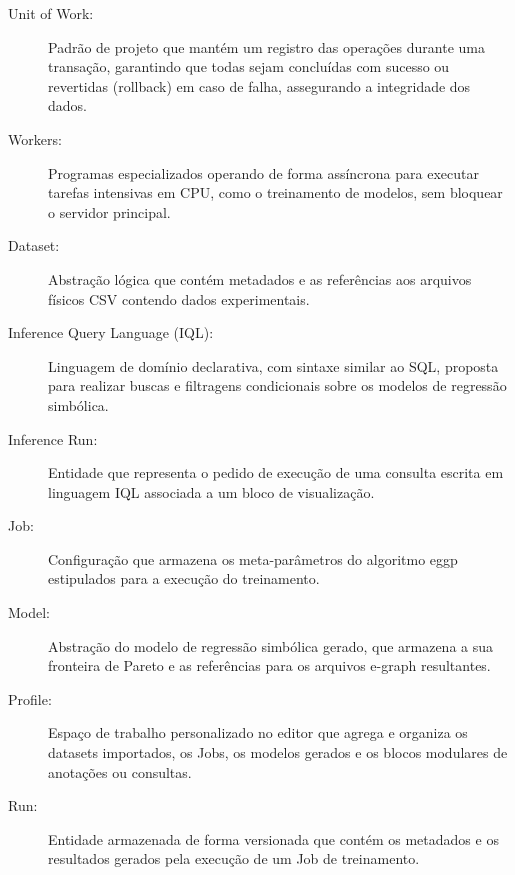 \begin{description}
    \item[Unit of Work:] Padrão de projeto que mantém um registro das operações durante uma transação, garantindo que todas sejam concluídas com sucesso ou revertidas (rollback) em caso de falha, assegurando a integridade dos dados.
    \item[Workers:] Programas especializados operando de forma assíncrona para executar tarefas intensivas em CPU, como o treinamento de modelos, sem bloquear o servidor principal.
    \item[Dataset:] Abstração lógica que contém metadados e as referências aos arquivos físicos CSV contendo dados experimentais.
    \item[Inference Query Language (IQL):] Linguagem de domínio declarativa, com sintaxe similar ao SQL, proposta para realizar buscas e filtragens condicionais sobre os modelos de regressão simbólica.
    \item[Inference Run:] Entidade que representa o pedido de execução de uma consulta escrita em linguagem IQL associada a um bloco de visualização.
    \item[Job:] Configuração que armazena os meta-parâmetros do algoritmo eggp estipulados para a execução do treinamento.
    \item[Model:] Abstração do modelo de regressão simbólica gerado, que armazena a sua fronteira de Pareto e as referências para os arquivos e-graph resultantes.
    \item[Profile:] Espaço de trabalho personalizado no editor que agrega e organiza os datasets importados, os Jobs, os modelos gerados e os blocos modulares de anotações ou consultas.
    \item[Run:] Entidade armazenada de forma versionada que contém os metadados e os resultados gerados pela execução de um Job de treinamento.
\end{description}
